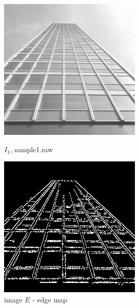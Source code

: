 \documentclass[12pt,a4paper,notitlepage,oneside,amsmath,amssymb]{article}
\begin{document}
\begin{CJK*}{UTF8}{bkai}
\begin{enumerate}[label=(\alph*)]
		      \begin{figure}[hbt!]
			      \centering
			      \begin{minipage}{.4\textwidth}
				      \centering
				      \includegraphics[width=.85\linewidth]{sample1}
				      \caption*{\(I_1\), sample1.raw}
			      \end{minipage}%
			      \begin{minipage}{.4\textwidth}
				      \centering
				      \includegraphics[width=.85\linewidth]{image_E}
				      \caption*{image \(E\) - edge map}
			      \end{minipage}
		      \end{figure}


\end{enumerate}
\end{CJK*}
\end{document}
